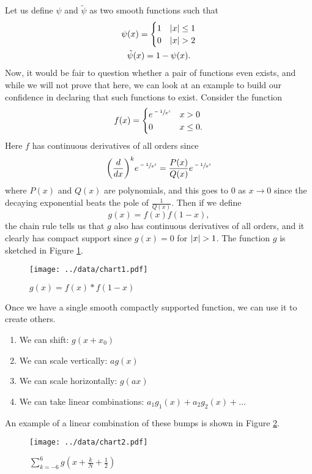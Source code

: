 Let us define $\psi$ and $\tilde{\psi}$ as two smooth functions such that
\begin{gather}
\psi(x) = \begin{cases}
1 & \lvert x\rvert \leq 1 \\
0 & \lvert x\rvert > 2 \\
\end{cases} \notag\\
\tilde{\psi}(x) = 1 - \psi(x). \notag
\end{gather}
Now, it would be fair to question whether a pair of functions even exists, and while we will not prove that here, we can look at an example to build our confidence in declaring that such functions to exist.
Consider the function 
\[
f(x) = \begin{cases}
e^{\sfrac{-1}{x^2}} & x > 0 \\
0 & x \leq 0.
\end{cases}
\]
Here $f$ has continuous derivatives of all orders since 
\[
\bigg(\frac{d}{dx}\bigg)^k e^{\sfrac{-1}{x^2}} = \frac{P(x)}{Q(x)}e^{\sfrac{-1}{x^2}}
\]
where $P(x)$ and $Q(x)$ are polynomials, and this goes to 0 as $x \to 0$ since the decaying exponential beats the pole of $\frac{1}{Q(x)}$.
Then if we define
\[
g(x) = f(x)f(1-x),
\]
the chain rule tells us that $g$ also has continuous derivatives of all orders, and it clearly has compact support since $g(x) = 0$ for $\lvert x\rvert > 1$. The function $g$ is sketched in Figure \ref{fig:bump}.
\begin{figure}
	\texttt{[image: ../data/chart1.pdf]}
	\caption{\label{fig:bump} $g(x) = f(x)*f(1-x)$}
\end{figure}
Once we have a single smooth compactly supported function, we can use it to create others.
\begin{enumerate}
	\item We can shift: $g(x + x_0)$ \\
	\item We can scale vertically: $ag(x)$ \\
	\item We can scale horizontally: $g(ax)$ \\
	\item We can take linear combinations: $a_1 g_1(x) + a_2 g_2(x) + \ldots$\\
\end{enumerate}
An example of a linear combination of these bumps is shown in Figure \ref{fig:pbump6}.
\begin{figure}
	\texttt{[image: ../data/chart2.pdf]}
	\caption{\label{fig:pbump6} $\sum_{k=-6}^6 g(x + \frac{k}{N} + \frac{1}{2})$}
\end{figure}
